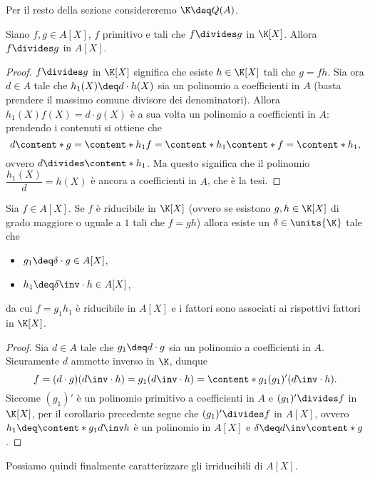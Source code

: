 Per il resto della sezione considereremo $\K \deq Q(A)$.

\begin{corollary}
    Siano $f, g \in A[X]$, $f$ primitivo e tali che $f \divides g$ in $\K[X]$. Allora $f \divides g$ in $A[X]$.
\end{corollary}
\begin{proof}
    $f \divides g$ in $\K[X]$ significa che esiste $h \in \K[X]$ tali che $g = fh$. Sia ora $d \in A$ tale che $h_1(X) \deq d \cdot h(X)$ sia un polinomio a coefficienti in $A$ (basta prendere il massimo comune divisore dei denominatori). Allora $h_1(X)f(X) = d\cdot g(X)$ è a sua volta un polinomio a coefficienti in $A$: prendendo i contenuti si ottiene che \[
        d\content*{g} = \content*{h_1f} = \content*{h_1}\content*{f} = \content*{h_1},    
    \] ovvero $d \divides \content*{h_1}$. Ma questo significa che il polinomio $\dfrac{h_1(X)}{d} = h(X)$ è ancora a coefficienti in $A$, che è la tesi.
\end{proof}

\begin{corollary}
    \label{cor:rid_in_K[X]=>rid_in_A[X]}
    Sia $f \in A[X]$. Se $f$ è riducibile in $\K[X]$ (ovvero se esistono $g, h \in \K[X]$ di grado maggiore o uguale a $1$ tali che $f = gh$) allora esiste un $\delta \in \units{\K}$ tale che \begin{itemize}
        \item $g_1 \deq \delta\cdot g \in A[X]$,
        \item $h_1 \deq \delta\inv\cdot h \in A[X]$,
    \end{itemize}
    da cui $f = g_1h_1$ è riducibile in $A[X]$ e i fattori sono associati ai rispettivi fattori in $\K[X]$.
\end{corollary}
\begin{proof}
    Sia $d \in A$ tale che $g_1 \deq d\cdot g$ sia un polinomio a coefficienti in $A$. Sicuramente $d$ ammette inverso in $\K$, dunque \[
        f = (d \cdot g)(d\inv \cdot h) = g_1 (d\inv \cdot h) = \content*{g_1}(g_1)'(d\inv \cdot h).    
    \] Siccome $(g_1)'$ è un polinomio primitivo a coefficienti in $A$ e $(g_1)' \divides f$ in $\K[X]$, per il corollario precedente segue che $(g_1)' \divides f$ in $A[X]$, ovvero $h_1 \deq \content*{g_1} d\inv h$ è un polinomio in $A[X]$ e $\delta \deq d\inv\content*{g}$.
\end{proof}

Possiamo quindi finalmente caratterizzare gli irriducibili di $A[X]$.

